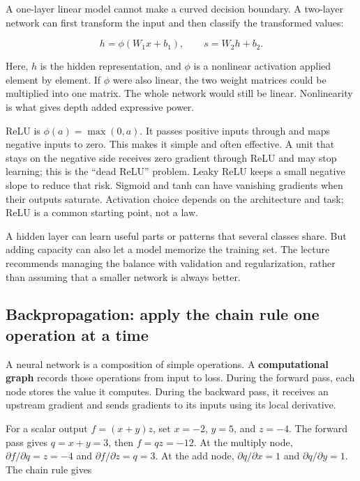 \hypertarget{04-visual-computing-ii-ch031-a-hidden-layer-adds-nonlinear-features}{}

A one-layer linear model cannot make a curved decision boundary. A two-layer network can first transform the input and then classify the transformed values:

\[h=\phi(W_1x+b_1),\qquad s=W_2h+b_2.\]

Here, \(h\) is the hidden representation, and \(\phi\) is a nonlinear activation applied element by element. If \(\phi\) were also linear, the two weight matrices could be multiplied into one matrix. The whole network would still be linear. Nonlinearity is what gives depth added expressive power.

ReLU is \(\phi(a)=\max(0,a)\). It passes positive inputs through and maps negative inputs to zero. This makes it simple and often effective. A unit that stays on the negative side receives zero gradient through ReLU and may stop learning; this is the ``dead ReLU'' problem. Leaky ReLU keeps a small negative slope to reduce that risk. Sigmoid and tanh can have vanishing gradients when their outputs saturate. Activation choice depends on the architecture and task; ReLU is a common starting point, not a law.

A hidden layer can learn useful parts or patterns that several classes share. But adding capacity can also let a model memorize the training set. The lecture recommends managing the balance with validation and regularization, rather than assuming that a smaller network is always better.

\subsection{Backpropagation: apply the chain rule one operation at a time}\label{04-visual-computing-ii-ch031-backpropagation-apply-the-chain-rule-one-operation-at-a-time}

\hypertarget{04-visual-computing-ii-ch031-backpropagation-apply-the-chain-rule-one-operation-at-a-time}{}

A neural network is a composition of simple operations. A \textbf{computational graph} records those operations from input to loss. During the forward pass, each node stores the value it computes. During the backward pass, it receives an upstream gradient and sends gradients to its inputs using its local derivative.

For a scalar output \(f=(x+y)z\), set \(x=-2\), \(y=5\), and \(z=-4\). The forward pass gives \(q=x+y=3\), then \(f=qz=-12\). At the multiply node, \(\partial f/\partial q=z=-4\) and \(\partial f/\partial z=q=3\). At the add node, \(\partial q/\partial x=1\) and \(\partial q/\partial y=1\). The chain rule gives

